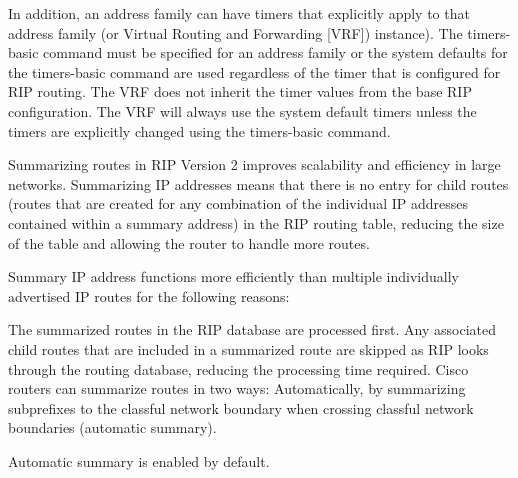 \documentclass[../EngineeringJournal_CDavis.tex]{subfiles}
\begin{document}
\hspace{0.2cm}
\begin{tcolorbox}[width=6.3in]
\scriptsize
In addition, an address family can have timers that explicitly apply to that address family (or Virtual Routing and Forwarding [VRF]) instance). The timers-basic command must be specified for an address family or the system defaults for the timers-basic command are used regardless of the timer that is configured for RIP routing. The VRF does not inherit the timer values from the base RIP configuration. The VRF will always use the system default timers unless the timers are explicitly changed using the timers-basic command.
\end{tcolorbox}
\hspace{0.2cm}
\normalsize  


\hspace{0.2cm}
\begin{tcolorbox}[width=6.3in]
\scriptsize
Summarizing routes in RIP Version 2 improves scalability and efficiency in large networks. Summarizing IP addresses means that there is no entry for child routes (routes that are created for any combination of the individual IP addresses contained within a summary address) in the RIP routing table, reducing the size of the table and allowing the router to handle more routes.

Summary IP address functions more efficiently than multiple individually advertised IP routes for the following reasons:

The summarized routes in the RIP database are processed first.
Any associated child routes that are included in a summarized route are skipped as RIP looks through the routing database, reducing the processing time required. Cisco routers can summarize routes in two ways:
Automatically, by summarizing subprefixes to the classful network boundary when crossing classful network boundaries (automatic summary).
\end{tcolorbox}
\hspace{0.2cm}
\normalsize  


\hspace{0.2cm}
\begin{tcolorbox}[width=6.3in]
Automatic summary is enabled by default.
\end{tcolorbox}
\hspace{0.2cm}
\end{document}
